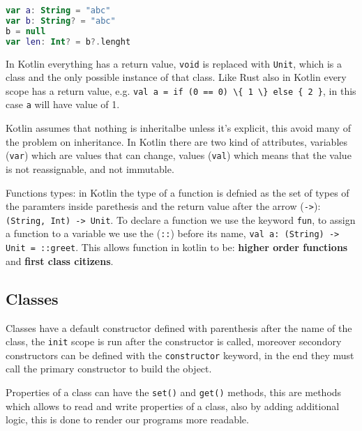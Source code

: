 \documentclass[12pt]{article}
\begin{document}
\begin{lstlisting}[language=kotlin]
var a: String = "abc"
var b: String? = "abc"
b = null
var len: Int? = b?.lenght
\end{lstlisting}
In Kotlin everything has a return value, \texttt{void} is replaced with \texttt{Unit}, which is a class and the only possible instance of that class. Like Rust also in Kotlin every scope has a return value, e.g. \verb|val a = if (0 == 0) \{ 1 \} else { 2 }|, in this case \texttt{a} will have value of 1.

Kotlin assumes that nothing is inheritalbe unless it's explicit, this avoid many of the problem on inheritance. In Kotlin there are two kind of attributes, variables (\texttt{var}) which are values that can change, values (\texttt{val}) which means that the value is not reassignable, and not immutable.

Functions types: in Kotlin the type of a function is defnied as the set of types of the paramters inside parethesis and the return value after the arrow (\verb|->|): \verb|(String, Int) -> Unit|. To declare a function we use the keyword \texttt{fun}, to assign a function to a variable we use the (\texttt{::}) before its name, \verb|val a: (String) -> Unit = ::greet|. This allows function in kotlin to be: \textbf{higher order functions} and \textbf{first class citizens}.

\subsection{Classes}
Classes have a default constructor defined with parenthesis after the name of the class, the \texttt{init} scope is run after the constructor is called, moreover secondory constructors can be defined with the \texttt{constructor} keyword, in the end they must call the primary constructor to build the object.

Properties of a class can have the \texttt{set()} and \texttt{get()} methods, this are methods which allows to read and write properties of a class, also by adding additional logic, this is done to render our programs more readable.
\end{document}
